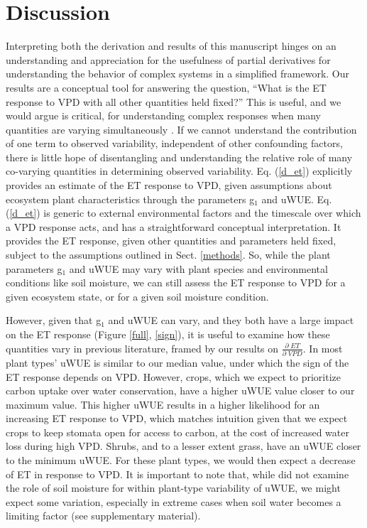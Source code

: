 \documentclass[draft]{agujournal2019}
\begin{document}
\section{Discussion}
\label{discussion}

Interpreting both the derivation and results of this manuscript hinges
on an understanding and appreciation for the usefulness of partial
derivatives for understanding the behavior of complex systems in a
simplified framework. Our results are a conceptual tool for answering
the question, ``What is the ET response to VPD with all other
quantities held fixed?'' This is useful, and we would argue is
critical, for understanding complex responses when many quantities are
varying simultaneously \cite{Zhou_2019}. If we cannot understand the
contribution of one term to observed variability, independent of other
confounding factors, there is little hope of disentangling and
understanding the relative role of many co-varying quantities in
determining observed variability.  Eq. (\ref{d_et}) explicitly
provides an estimate of the ET response to VPD, given assumptions
about ecosystem plant characteristics through the parameters g$_1$ and
uWUE. Eq. (\ref{d_et}) is generic to external environmental factors
and the timescale over which a VPD response acts, and has a
straightforward conceptual interpretation. It provides the ET
response, given other quantities and parameters held fixed, subject to
the assumptions outlined in Sect. \ref{methods}. So, while the plant
parameters g$_1$ and uWUE may vary with plant species and
environmental conditions like soil moisture, we can still assess the
ET response to VPD for a given ecosystem state, or for a given soil
moisture condition.

However, given that g$_1$ and uWUE can vary, and they both have a
large impact on the ET response (Figure \ref{full}, \ref{sign}), it is
useful to examine how these quantities vary in previous literature,
framed by our results on $\frac{\partial \; ET}{\partial \; VPD}$. In
 most plant types' uWUE is similar to our median
value, under which the sign of the ET response depends on
VPD. However, crops, which we expect to prioritize carbon uptake over
water conservation, have a higher uWUE value closer to our maximum
value. This higher uWUE results in a higher likelihood for an
increasing ET response to VPD, which matches intuition given that we
expect crops to keep stomata open for access to carbon, at the cost of
increased water loss during high VPD. Shrubs, and to a lesser extent
grass, have an uWUE closer to the minimum uWUE. For these plant types,
we would then expect a decrease of ET in response to VPD. It is
important to note that, while  did not examine the
role of soil moisture for within plant-type variability of uWUE, we
might expect some variation, especially in extreme cases when soil
water becomes a limiting factor (see supplementary material).
\end{document}
